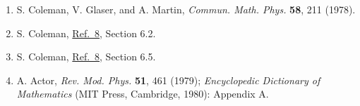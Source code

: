 \begin{enumerate}
\item {}\label{ch23-ref-37}
S. Coleman, V. Glaser, and A. Martin, \emph{Commun. Math. Phys.}
\textbf{58}, 211 (1978).

\item {}\label{ch23-ref-38}
S. Coleman, \hyperref[ch23-ref-8]{Ref.~8}, Section 6.2.

\item {}\label{ch23-ref-39}
S. Coleman, \hyperref[ch23-ref-8]{Ref.~8}, Section 6.5.

\item {}\label{ch23-ref-40}
A. Actor, \emph{Rev. Mod. Phys.} \textbf{51}, 461 (1979);
\emph{Encyclopedic Dictionary of Mathematics} (MIT Press, Cambridge,
1980): Appendix A.
\end{enumerate}
